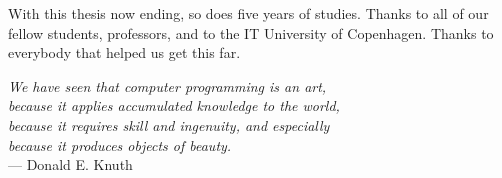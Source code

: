 \pagestyle{empty}

\hfill

\vfill




\noindent With this thesis now ending, so does five years of studies. Thanks to all of our fellow students, professors, and to the IT University of Copenhagen. Thanks to everybody that helped us get this far.

\bigskip

\begin{flushright}{\slshape    
    We have seen that computer programming is an art, \\ 
    because it applies accumulated knowledge to the world, \\ 
    because it requires skill and ingenuity, and especially \\
    because it produces objects of beauty.} \\ \medskip
    --- Donald E. Knuth
\end{flushright}

\bigskip

\noindent\finalVersionString




